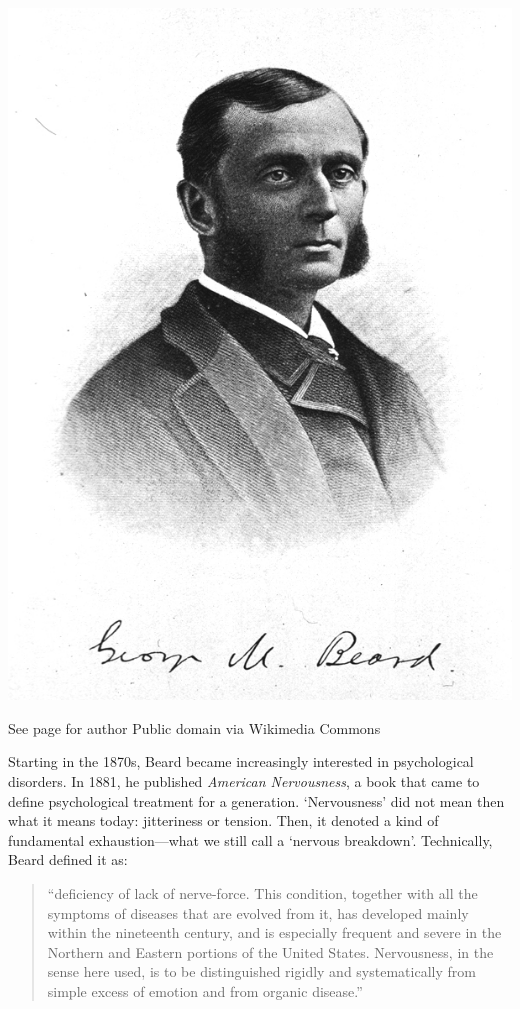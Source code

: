 \begin{refsection}
\begin{marginfigure}
\begin{center}
     \includegraphics[scale=0.25]{../images/George_Miller_Beard.jpg}
\end{center}
 \caption{See page for author Public domain via Wikimedia Commons}
\label{fig: georgebeard}
\end{marginfigure}
 

Starting in the 1870s, Beard became increasingly interested in psychological disorders. In 1881, he published \emph{American Nervousness}, a book that came to define psychological treatment for a generation. `Nervousness' did not mean then what it means today: jitteriness or tension. Then, it denoted a kind of fundamental exhaustion---what we still call a `nervous breakdown'. Technically, Beard defined it as:

\begin{quote}

``deficiency of lack of nerve-force. This condition, together with all the symptoms of diseases that are evolved from it, has developed mainly within the nineteenth century, and is especially frequent and severe in the Northern and Eastern portions of the United States. Nervousness, in the sense here used, is to be distinguished rigidly and systematically from simple excess of emotion and from organic disease.'' ~\citep[p. vi]{Beard:1881tg}
\end{quote}


\end{refsection}
